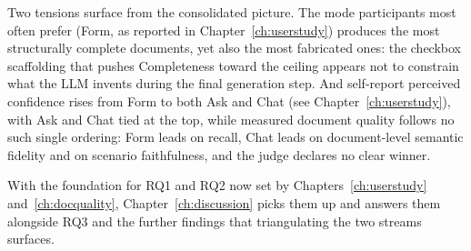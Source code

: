Two tensions surface from the consolidated picture. The mode
participants most often prefer (Form, as reported in
Chapter~\ref{ch:userstudy}) produces the most structurally
complete documents, yet also the most fabricated ones: the
checkbox scaffolding that pushes Completeness toward the ceiling
appears not to constrain what the LLM invents during the final
generation step. And self-report perceived confidence rises from Form to both Ask
and Chat (see Chapter~\ref{ch:userstudy}), with Ask and Chat tied
at the top, while measured document quality follows no such
single ordering: Form leads on recall, Chat leads on
document-level semantic fidelity and on scenario faithfulness,
and the judge declares no clear winner.

With the foundation for RQ1 and RQ2 now set by
Chapters~\ref{ch:userstudy} and~\ref{ch:docquality},
Chapter~\ref{ch:discussion} picks them up and answers them
alongside RQ3 and the further findings that triangulating the
two streams surfaces.